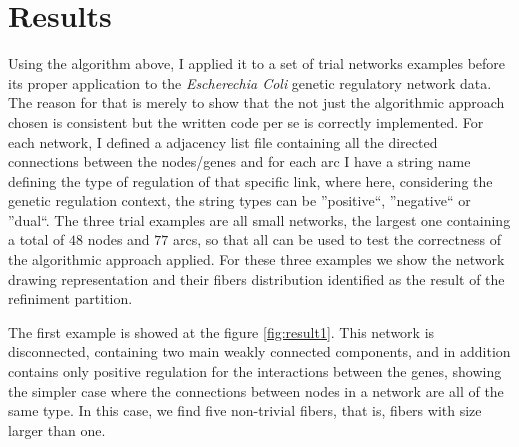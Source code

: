 \documentclass[12pt]{diazessay} %
\begin{document}

\section*{Results}

Using the algorithm above, I applied it to a set of trial networks examples before its proper application to the \textit{Escherechia Coli} genetic regulatory network data. The reason for that is merely to show that the not just the algorithmic approach chosen is consistent but the written code per se is correctly implemented. For each network, I defined a adjacency list file containing all the directed connections between the nodes/genes and for each arc I have a string name defining the type of regulation of that specific link, where here, considering the genetic regulation context, the string types can be ''positive``, ''negative`` or ''dual``. The three trial examples are all small networks, the largest one containing a total of $48$ nodes and $77$ arcs, so that all can be used to test the correctness of the algorithmic approach applied. For these three examples we show the network drawing representation and their fibers distribution identified as the result of the refiniment partition.

The first example is showed at the figure \ref{fig:result1}. This network is disconnected, containing two main weakly connected components, and in addition contains only positive regulation for the interactions between the genes, showing the simpler case where the connections between nodes in a network are all of the same type. In this case, we find five non-trivial fibers, that is, fibers with size larger than one.
\end{document}
